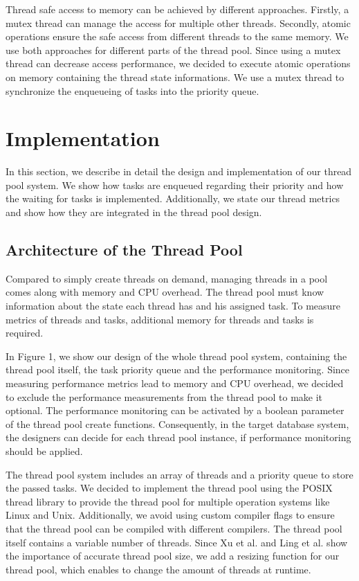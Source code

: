 \documentclass[conference]{IEEEtran}
\begin{document}
Thread safe access to memory can be achieved by different approaches. Firstly, a mutex thread can manage the access for multiple other threads. Secondly, atomic operations ensure the safe access from different threads to the same memory. We use both approaches for different parts of the thread pool. Since using a mutex thread can decrease access performance, we decided to execute atomic operations on memory containing the thread state informations. We use a mutex thread to synchronize the enqueueing of tasks into the priority queue.

\section{Implementation}
In this section, we describe in detail the design and implementation of our thread pool system. We show how tasks are enqueued regarding their priority and how the waiting for tasks is implemented. Additionally, we state our thread metrics and show how they are integrated in the thread pool design.

\subsection{Architecture of the Thread Pool}
Compared to simply create threads on demand, managing threads in a pool comes along with memory and CPU overhead. The thread pool must know information about the state each thread has and his assigned task. To measure metrics of threads and tasks, additional memory for threads and tasks is required.

In Figure 1, we show our design of the whole thread pool system, containing the thread pool itself, the task priority queue and the performance monitoring. Since measuring performance metrics lead to memory and CPU overhead, we decided to exclude the performance measurements from the thread pool to make it optional. The performance monitoring can be activated by a boolean parameter of the thread pool create functions. Consequently, in the target database system, the designers can decide for each thread pool instance, if performance monitoring should be applied.

The thread pool system includes an array of threads and a priority queue to store the passed tasks. We decided to implement the thread pool using the POSIX thread library to provide the thread pool for multiple operation systems like Linux and Unix. Additionally, we avoid using custom compiler flags to ensure that the thread pool can be compiled with different compilers. The thread pool itself contains a variable number of threads. Since Xu et al. \cite{xu2004performance} and Ling et al. \cite{ling2000analysis} show the importance of accurate thread pool size, we add a resizing function for our thread pool, which enables to change the amount of threads at runtime.
\end{document}
